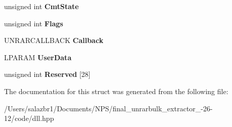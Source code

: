 \begin{DoxyCompactItemize}
\item 
\hypertarget{struct_r_a_r_open_archive_data_ex_a6421dada12c14d6381a1a4b8145f85c5}{unsigned int {\bfseries Cmt\-State}}\label{struct_r_a_r_open_archive_data_ex_a6421dada12c14d6381a1a4b8145f85c5}

\item 
\hypertarget{struct_r_a_r_open_archive_data_ex_af9dc92a113af3fcbefedb5dd5a255b2d}{unsigned int {\bfseries Flags}}\label{struct_r_a_r_open_archive_data_ex_af9dc92a113af3fcbefedb5dd5a255b2d}

\item 
\hypertarget{struct_r_a_r_open_archive_data_ex_a3c6b395f48b12bf435f81b13a1443535}{U\-N\-R\-A\-R\-C\-A\-L\-L\-B\-A\-C\-K {\bfseries Callback}}\label{struct_r_a_r_open_archive_data_ex_a3c6b395f48b12bf435f81b13a1443535}

\item 
\hypertarget{struct_r_a_r_open_archive_data_ex_a5bfc4df980ef254e2c4d44e7756c2282}{L\-P\-A\-R\-A\-M {\bfseries User\-Data}}\label{struct_r_a_r_open_archive_data_ex_a5bfc4df980ef254e2c4d44e7756c2282}

\item 
\hypertarget{struct_r_a_r_open_archive_data_ex_ab9ea3cb6f167bf3ee88badd2c94d6e14}{unsigned int {\bfseries Reserved} \mbox{[}28\mbox{]}}\label{struct_r_a_r_open_archive_data_ex_ab9ea3cb6f167bf3ee88badd2c94d6e14}

\end{DoxyCompactItemize}


The documentation for this struct was generated from the following file\-:\begin{DoxyCompactItemize}
\item 
/\-Users/salazbr1/\-Documents/\-N\-P\-S/final\-\_\-unrarbulk\-\_\-extractor\-\_-\/26-\/12/code/dll.\-hpp\end{DoxyCompactItemize}

